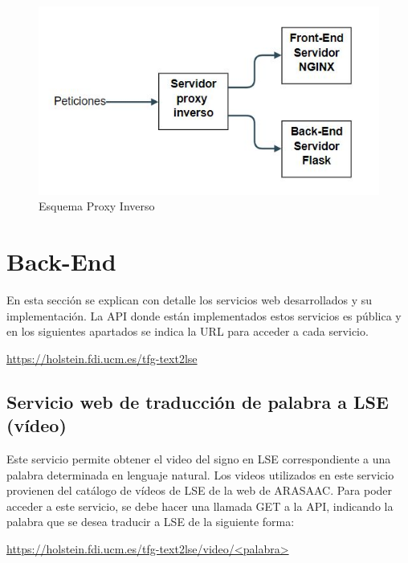 \begin{figure}[]
	\centering
	
	\includegraphics[width=1\textwidth]{Imagenes/Fuentes/Text2LSE/proxy.jpg}
	\caption{Esquema Proxy Inverso}
	\label {fig: imgProxy}
\end{figure}

\section{Back-End}

En esta sección se explican con detalle los servicios web desarrollados y su implementación. La API donde están implementados estos servicios es pública y en los siguientes apartados se indica la URL para acceder a cada servicio.

\begin{shaded}
	\url{https://holstein.fdi.ucm.es/tfg-text2lse }	
\end{shaded}



\subsection{Servicio web de traducción de palabra a LSE (vídeo)}

Este servicio permite obtener el video del signo en LSE correspondiente a una palabra determinada en lenguaje natural. Los videos utilizados en este servicio provienen del catálogo de vídeos de LSE de la web de ARASAAC. Para poder acceder a este servicio, se debe hacer una llamada GET a la API,  indicando la palabra que se desea traducir a LSE de la siguiente forma:\\

\begin{shaded}
	\url{https://holstein.fdi.ucm.es/tfg-text2lse/video/<palabra> }	
\end{shaded}

